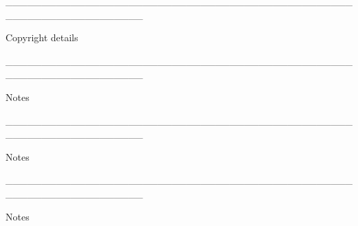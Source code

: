 \documentclass[a4paper,portrait,12pt]{article}
\begin{document}
\_\_\_\_\_\_\_\_\_\_\_\_\_\_\_\_\_\_\_\_\_\_\_\_\_\_\_\_\_\_\_\_\_\_\_\_\_\_\_\_\_\_\_\_\_\_\_\_\_\_\_\_\_\_\_\_\_\_\_\_\_\_\_\_\_\_\_





Copyright details











\_\_\_\_\_\_\_\_\_\_\_\_\_\_\_\_\_\_\_\_\_\_\_\_\_\_\_\_\_\_\_\_\_\_\_\_\_\_\_\_\_\_\_\_\_\_\_\_\_\_\_\_\_\_\_\_\_\_\_\_\_\_\_\_\_\_\_





Notes











\_\_\_\_\_\_\_\_\_\_\_\_\_\_\_\_\_\_\_\_\_\_\_\_\_\_\_\_\_\_\_\_\_\_\_\_\_\_\_\_\_\_\_\_\_\_\_\_\_\_\_\_\_\_\_\_\_\_\_\_\_\_\_\_\_\_\_





Notes











\_\_\_\_\_\_\_\_\_\_\_\_\_\_\_\_\_\_\_\_\_\_\_\_\_\_\_\_\_\_\_\_\_\_\_\_\_\_\_\_\_\_\_\_\_\_\_\_\_\_\_\_\_\_\_\_\_\_\_\_\_\_\_\_\_\_\_





Notes
\end{document}
